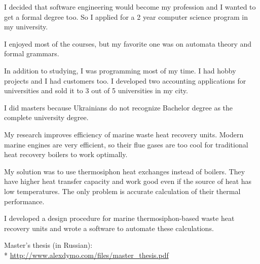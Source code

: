 \documentclass[12pt]{letter}
\begin{document}
\begin{llist}
  \endexperience


  \startexperience

            \item I decided that software engineering would become my profession and I wanted to get a formal degree too. So I applied for a 2 year computer science program in my university.

            \item I enjoyed most of the courses, but my favorite one was on automata theory and formal grammars.

            \item In addition to studying, I was programming most of my time. I had hobby projects and I had customers too. I developed two accounting applications for universities and sold it to 3 out of 5 universities in my city.

  \endexperience


  \startexperience

            \item I did masters because Ukrainians do not recognize Bachelor degree as the complete university degree.

            \item My research improves efficiency of marine waste heat recovery units. Modern marine engines are very efficient, so their flue gases are too cool for traditional heat recovery boilers to work optimally.

            \item My solution was to use thermosiphon heat exchanges instead of boilers. They have higher heat transfer capacity and work good even if the source of heat has low temperatures. The only problem is accurate calculation of their thermal performance.

            \item I developed a design procedure for marine thermosiphon-based waste heat recovery units and wrote a software to automate these calculations.

            \item Master's thesis (in Russian):\\*
            \url{http://www.alexdymo.com/files/master_thesis.pdf}


\end{llist}
\end{document}
